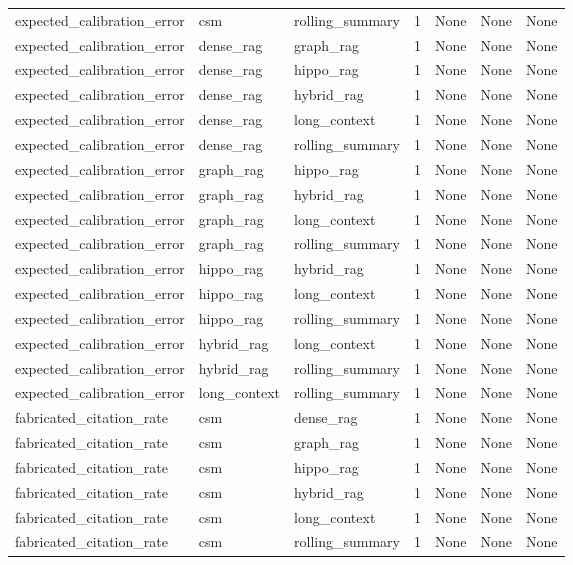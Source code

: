\begin{tabular}{lllllll}
expected\_calibration\_error & csm & rolling\_summary & 1 & None & None & None \\
expected\_calibration\_error & dense\_rag & graph\_rag & 1 & None & None & None \\
expected\_calibration\_error & dense\_rag & hippo\_rag & 1 & None & None & None \\
expected\_calibration\_error & dense\_rag & hybrid\_rag & 1 & None & None & None \\
expected\_calibration\_error & dense\_rag & long\_context & 1 & None & None & None \\
expected\_calibration\_error & dense\_rag & rolling\_summary & 1 & None & None & None \\
expected\_calibration\_error & graph\_rag & hippo\_rag & 1 & None & None & None \\
expected\_calibration\_error & graph\_rag & hybrid\_rag & 1 & None & None & None \\
expected\_calibration\_error & graph\_rag & long\_context & 1 & None & None & None \\
expected\_calibration\_error & graph\_rag & rolling\_summary & 1 & None & None & None \\
expected\_calibration\_error & hippo\_rag & hybrid\_rag & 1 & None & None & None \\
expected\_calibration\_error & hippo\_rag & long\_context & 1 & None & None & None \\
expected\_calibration\_error & hippo\_rag & rolling\_summary & 1 & None & None & None \\
expected\_calibration\_error & hybrid\_rag & long\_context & 1 & None & None & None \\
expected\_calibration\_error & hybrid\_rag & rolling\_summary & 1 & None & None & None \\
expected\_calibration\_error & long\_context & rolling\_summary & 1 & None & None & None \\
fabricated\_citation\_rate & csm & dense\_rag & 1 & None & None & None \\
fabricated\_citation\_rate & csm & graph\_rag & 1 & None & None & None \\
fabricated\_citation\_rate & csm & hippo\_rag & 1 & None & None & None \\
fabricated\_citation\_rate & csm & hybrid\_rag & 1 & None & None & None \\
fabricated\_citation\_rate & csm & long\_context & 1 & None & None & None \\
fabricated\_citation\_rate & csm & rolling\_summary & 1 & None & None & None \\

\end{tabular}
